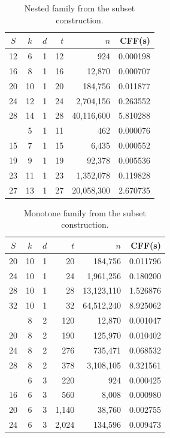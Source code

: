 \begin{table}[htbp]
  \centering
  \begin{tabular}{cccrrr}
  \toprule
  $S$ & $k$ & $d$ & $t$ & $n$ & \textbf{CFF(s)} \\
  \midrule
  12 & 6 & 1 & 12 & 924 & 0.000198 \\
  16 & 8 & 1 & 16 & 12{,}870 & 0.000707 \\
  20 & 10 & 1 & 20 & 184{,}756 & 0.011877 \\
  24 & 12 & 1 & 24 & 2{,}704{,}156 & 0.263552 \\
  28 & 14 & 1 & 28 & 40{,}116{,}600 & 5.810288 \\
  \addlinespace
  11 & 5 & 1 & 11 & 462 & 0.000076 \\
  15 & 7 & 1 & 15 & 6{,}435 & 0.000552 \\
  19 & 9 & 1 & 19 & 92{,}378 & 0.005536 \\
  23 & 11 & 1 & 23 & 1{,}352{,}078 & 0.119828 \\
  27 & 13 & 1 & 27 & 20{,}058{,}300 & 2.670735 \\
  \bottomrule
  \end{tabular}
  \caption{Nested family from the subset construction.}
  \label{tab:subset-nested}
\end{table}

\begin{table}[htbp]
  \centering
  \begin{tabular}{cccrrr}
  \toprule
  $S$ & $k$ & $d$ & $t$ & $n$ & \textbf{CFF(s)} \\
  \midrule
  20 & 10 & 1 & 20 & 184{,}756 & 0.011796 \\
  24 & 10 & 1 & 24 & 1{,}961{,}256 & 0.180200 \\
  28 & 10 & 1 & 28 & 13{,}123{,}110 & 1.526876 \\
  32 & 10 & 1 & 32 & 64{,}512{,}240 & 8.925062 \\
  \addlinespace
  16 & 8 & 2 & 120 & 12{,}870 & 0.001047 \\
  20 & 8 & 2 & 190 & 125{,}970 & 0.010402 \\
  24 & 8 & 2 & 276 & 735{,}471 & 0.068532 \\
  28 & 8 & 2 & 378 & 3{,}108{,}105 & 0.321561 \\
  \addlinespace
  12 & 6 & 3 & 220 & 924 & 0.000425 \\
  16 & 6 & 3 & 560 & 8{,}008 & 0.000980 \\
  20 & 6 & 3 & 1{,}140 & 38{,}760 & 0.002755 \\
  24 & 6 & 3 & 2{,}024 & 134{,}596 & 0.009473 \\
  \bottomrule
  \end{tabular}
  \caption{Monotone family from the subset construction.}
  \label{tab:subset-monotone}
\end{table}

